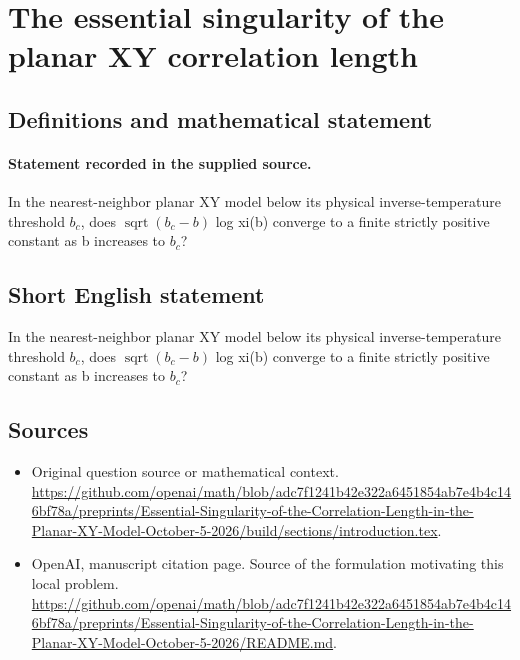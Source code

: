 \documentclass[11pt]{article}
\begin{document}
\section*{The essential singularity of the planar XY correlation length}\label{statement}
\subsection{Definitions and mathematical statement}
\paragraph{Statement recorded in the supplied source.}
In the nearest-neighbor planar XY model below its physical inverse-temperature threshold $b_c$, does $\operatorname{sqrt}(b_c-b)$ log xi(b) converge to a finite strictly positive constant as b increases to $b_c$?
\subsection{Short English statement}
In the nearest-neighbor planar XY model below its physical inverse-temperature threshold $b_c$, does $\operatorname{sqrt}(b_c-b)$ log xi(b) converge to a finite strictly positive constant as b increases to $b_c$?
\subsection{Sources}
\begin{itemize}
\item[S1] Original question source or mathematical context.
\url{https://github.com/openai/math/blob/adc7f1241b42e322a6451854ab7e4b4c146bf78a/preprints/Essential-Singularity-of-the-Correlation-Length-in-the-Planar-XY-Model-October-5-2026/build/sections/introduction.tex}.
\item[S2] OpenAI, manuscript citation page. Source of the formulation motivating this local problem.
\url{https://github.com/openai/math/blob/adc7f1241b42e322a6451854ab7e4b4c146bf78a/preprints/Essential-Singularity-of-the-Correlation-Length-in-the-Planar-XY-Model-October-5-2026/README.md}.
\end{itemize}
\end{document}
